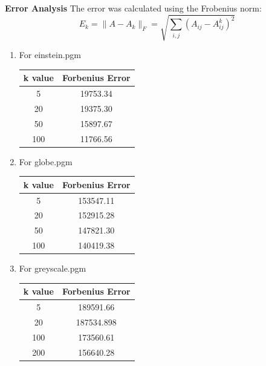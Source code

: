 \documentclass[journal]{IEEEtran}
\begin{document}
\textbf{Error Analysis}
The error was calculated using the Frobenius norm:
\[
E_k = \| A - A_k \|_F = \sqrt{ \sum_{i,j} (A_{ij} - A_{ij}^{k})^2 }
\]

\begin{enumerate}

\item For einstein.pgm
\begin{table}[H]
    \centering
    \begin{tabular}{|c|c|}
        \hline
        \textbf{k value} & \textbf{Forbenius Error} \\  
        \hline
        5 & 19753.34 \\                              
        \hline
        20 & 19375.30 \\                         
        \hline
        50 & 15897.67 \\       
        \hline
        100 & 11766.56 \\       
        \hline
    \end{tabular}
       \label{tab:1}
\end{table}

\item For globe.pgm
\begin{table}[H]
    \centering
    \begin{tabular}{|c|c|}
        \hline
        \textbf{k value} & \textbf{Forbenius Error} \\  
        \hline
        5 & 153547.11 \\                              
        \hline
        20 & 152915.28 \\                         
        \hline
        50 & 147821.30 \\       
        \hline
        100 & 140419.38 \\       
        \hline
    \end{tabular}
    \label{tab:2}
\end{table}

\item For greyscale.pgm
\begin{table}[H]
    \centering
    \begin{tabular}{|c|c|}
        \hline
        \textbf{k value} & \textbf{Forbenius Error} \\  
     \hline
        5 & 189591.66 \\                              
        \hline
        20 & 187534.898 \\                         
        \hline
        100 & 173560.61 \\       
        \hline
        200 & 156640.28 \\       
        \hline
    \end{tabular}
    \label{tab:3}
\end{table}

\end{enumerate}
\end{document}

